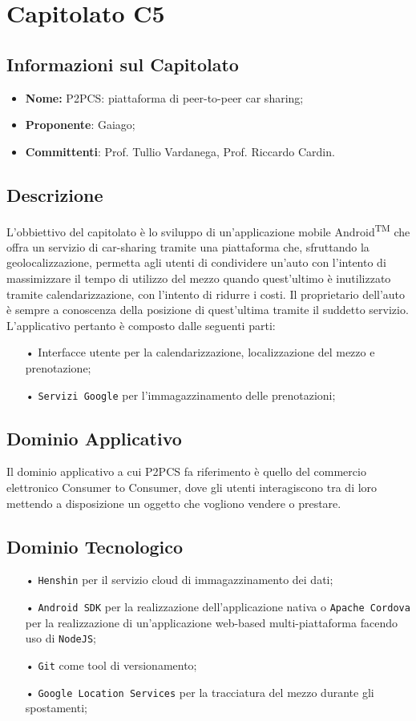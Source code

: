 \section{Capitolato C5}
\subsection{Informazioni sul Capitolato}
\begin{itemize}
	\item \textbf{Nome:} P2PCS: piattaforma di peer-to-peer car sharing;
	\item \textbf{Proponente}: Gaiago;
	\item \textbf{Committenti}: Prof. Tullio Vardanega, Prof. Riccardo Cardin.
\end{itemize}
\subsection{Descrizione}
L'obbiettivo del capitolato è lo sviluppo di un'applicazione mobile Android\textsuperscript{TM} che offra un servizio di car-sharing tramite una piattaforma che, sfruttando la geolocalizzazione, permetta agli utenti di condividere un'auto con l'intento di massimizzare il tempo di utilizzo del mezzo quando quest'ultimo è inutilizzato tramite calendarizzazione, con l'intento di ridurre i costi. Il proprietario dell'auto è sempre a conoscenza della posizione di quest'ultima tramite il suddetto servizio. L'applicativo pertanto è composto dalle seguenti parti:
\begin{itemize}
\item[•] Interfacce utente per la calendarizzazione, localizzazione del mezzo e prenotazione;
\item[•] \texttt{Servizi Google} per l'immagazzinamento delle prenotazioni;
\end{itemize}
\subsection{Dominio Applicativo}
Il dominio applicativo a cui P2PCS fa riferimento è quello del commercio elettronico Consumer to Consumer, dove gli utenti interagiscono tra di loro mettendo a disposizione un oggetto che vogliono vendere o prestare.
\subsection{Dominio Tecnologico}
\begin{itemize}
\item[•] \texttt{Henshin} per il servizio cloud di immagazzinamento dei dati;
\item[•] \texttt{Android SDK} per la realizzazione dell'applicazione nativa o \texttt{Apache Cordova} per la realizzazione di un'applicazione web-based multi-piattaforma facendo uso di \texttt{NodeJS};
\item[•] \texttt{Git} come tool di versionamento;
\item[•] \texttt{Google Location Services} per la tracciatura del mezzo durante gli spostamenti;
\end{itemize}

